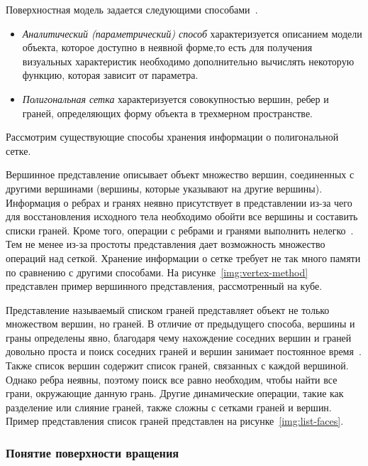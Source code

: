Поверхностная модель задается следующими способами~\cite{roders, porev}.
\begin{itemize}
	\item \textit{Аналитический (параметрический) способ} характеризуется описанием модели объекта, которое доступно в неявной форме,то есть для получения визуальных характеристик необходимо дополнительно вычислять некоторую функцию, которая зависит от параметра. 
	\item \textit{Полигональная сетка} характеризуется совокупностью вершин, ребер и граней, определяющих форму объекта в трехмерном пространстве.
\end{itemize}

Рассмотрим существующие способы хранения информации о полигональной сетке.

Вершинное представление описывает объект множество вершин, соединенных с другими вершинами (вершины, которые указывают на другие вершины). 
Информация о ребрах и гранях неявно присутствует в представлении из-за чего для восстановления исходного тела необходимо обойти все вершины и составить списки граней. 
Кроме того, операции с ребрами и гранями выполнить нелегко~\cite{aaymodelmethod}.
Тем не менее из-за простоты представления дает возможность множество операций над сеткой. 
Хранение информации о сетке требует не так много памяти по сравнению с другими способами.
На рисунке~\ref{img:vertex-method} представлен пример вершинного представления, рассмотренный на кубе.


Представление называемый списком граней представляет объект не только множеством вершин, но граней. 
В отличие от предыдущего способа, вершины и граны определены явно, благодаря чему нахождение соседних вершин и граней довольно проста и поиск соседних граней и вершин занимает постоянное время~\cite{aaymodelmethod}. 
Также список вершин содержит список граней, связанных с каждой вершиной. 
Однако ребра неявны, поэтому поиск все равно необходим, чтобы найти все грани, окружающие данную грань. 
Другие динамические операции, такие как разделение или слияние граней, также сложны с сетками граней и вершин. 
Пример представления список граней представлен на рисунке~\ref{img:list-faces}.


\subsubsection{Понятие поверхности вращения}

